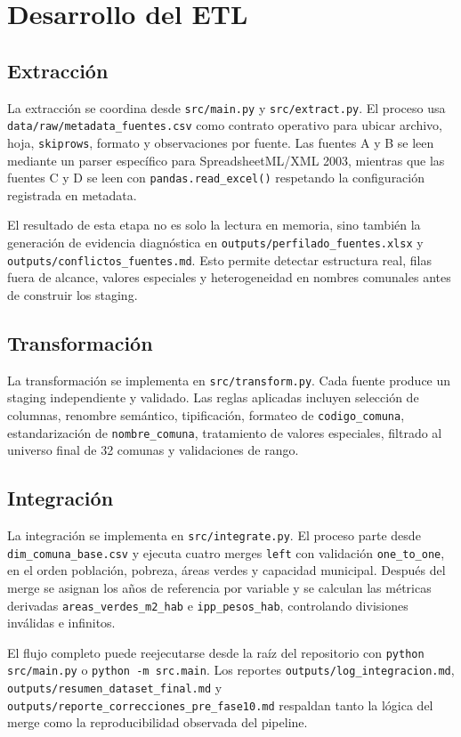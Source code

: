 \chapter{Desarrollo del ETL}

\section{Extracción}

La extracción se coordina desde \texttt{src/main.py} y \texttt{src/extract.py}. El proceso usa \texttt{data/raw/metadata\_fuentes.csv} como contrato operativo para ubicar archivo, hoja, \texttt{skiprows}, formato y observaciones por fuente. Las fuentes A y B se leen mediante un parser específico para SpreadsheetML/XML 2003, mientras que las fuentes C y D se leen con \texttt{pandas.read\_excel()} respetando la configuración registrada en metadata.

El resultado de esta etapa no es solo la lectura en memoria, sino también la generación de evidencia diagnóstica en \texttt{outputs/perfilado\_fuentes.xlsx} y \texttt{outputs/conflictos\_fuentes.md}. Esto permite detectar estructura real, filas fuera de alcance, valores especiales y heterogeneidad en nombres comunales antes de construir los staging.

\section{Transformación}

La transformación se implementa en \texttt{src/transform.py}. Cada fuente produce un staging independiente y validado. Las reglas aplicadas incluyen selección de columnas, renombre semántico, tipificación, formateo de \texttt{codigo\_comuna}, estandarización de \texttt{nombre\_comuna}, tratamiento de valores especiales, filtrado al universo final de 32 comunas y validaciones de rango.



\section{Integración}

La integración se implementa en \texttt{src/integrate.py}. El proceso parte desde \texttt{dim\_comuna\_base.csv} y ejecuta cuatro merges \texttt{left} con validación \texttt{one\_to\_one}, en el orden población, pobreza, áreas verdes y capacidad municipal. Después del merge se asignan los años de referencia por variable y se calculan las métricas derivadas \texttt{areas\_verdes\_m2\_hab} e \texttt{ipp\_pesos\_hab}, controlando divisiones inválidas e infinitos.

El flujo completo puede reejecutarse desde la raíz del repositorio con \texttt{python src/main.py} o \texttt{python -m src.main}. Los reportes \texttt{outputs/log\_integracion.md}, \texttt{outputs/resumen\_dataset\_final.md} y \texttt{outputs/reporte\_correcciones\_pre\_fase10.md} respaldan tanto la lógica del merge como la reproducibilidad observada del pipeline.
